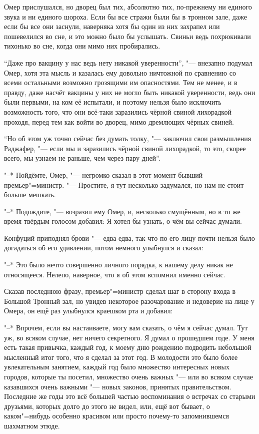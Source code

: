 Омер прислушался, но дворец был тих, абсолютно тих, по-прежнему ни единого звука
и ни единого шороха.
Если бы все стражи были бы в тронном зале, даже если бы все они заснули,
наверняка хотя бы один из них захрапел или пошевелился во сне, и это можно было
бы услышать.
Свиньи ведь похрюкивали тихонько во сне, когда они мимо них пробирались.

\enquote{Даже про вакцину у нас ведь нету никакой уверенности}, "--- внезапно
подумал Омер, хотя эта мысль и казалась ему довольно ничтожной по сравнению со
всеми остальными возможно грозящими им опасностями.
Тем не менее, и в правду, даже насчёт вакцины у них не могло быть никакой
уверенности, ведь они были первыми, на ком её испытали, и поэтому нельзя было
исключить возможность того, что они всё-таки заразились чёрной свиной лихорадкой
проходя, перед тем как войти во дворец, мимо дремлющих чёрных свиней.

\enquote{Но об этом уж точно сейчас без думать толку, "--- заключил свои размышления
Раджафер, "--- если мы и заразились чёрной свиной лихорадкой, то это, скорее
всего, мы узнаем не раньше, чем через пару дней}.

"--* Пойдёмте, Омер, "--- негромко сказал в этот момент бывший премьер"=министр.
"--- Простите, я тут несколько задумался, но нам не стоит больше мешкать.

"--* Подождите, "--- возразил ему Омер, и, несколько смущённым, но в то же время
твёрдым голосом добавил: Я хотел бы узнать, о чём вы сейчас думали.

Конфуций приподнял брови "--- едва-едва, так что по его лицу почти нельзя было
догадаться об его удивлении, потом немного улыбнулся и сказал:

"--* Это было нечто совершенно личного порядка, к нашему делу никак не
относящееся.
Нелепо, наверное, что я об этом вспомнил именно сейчас.

Сказав последнюю фразу, премьер"=министр сделал шаг в сторону входа в Большой
Тронный зал, но увидев некоторое разочарование и недоверие на лице у Омера, он
ещё раз улыбнулся краешком рта и добавил:

"--* Впрочем, если вы настаиваете, могу вам сказать, о чём я сейчас думал.
Тут уж, во всяком случае, нет ничего секретного.
Я думал о прошедшем годе.
У меня есть такая привычка, каждый год, к моему дню рождению подводить небольшой
мысленный итог того, что я сделал за этот год.
В молодости это было более увлекательным занятием, каждый год было множество
интересных новых городов, которые ты посетил, множество очень важных "--- или во
всяком случае казавшихся очень важными "--- новых законов, принятых
правительством.
Последние же годы это всё большей частью воспоминания о встречах со старыми
друзьями, которых долго до этого не видел, или, ещё вот бывает, о каком"=нибудь
особенно красивом или просто почему-то запомнившемся шахматном этюде.

